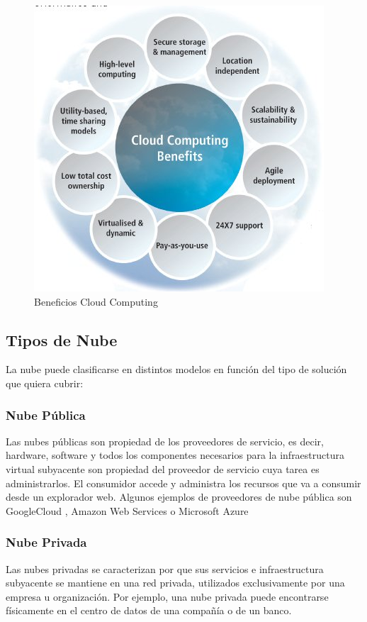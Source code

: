 \documentclass[a4paper,11pt]{book}
\begin{document}
\begin{figure}[H]
\centering
\includegraphics[scale=0.5]{imagenes/beneficiosCC.jpg}
\caption{ Beneficios Cloud Computing\cite{beneficios} }
\end{figure}


\subsection{Tipos de Nube}

La nube puede clasificarse en distintos modelos en función del tipo de solución que quiera cubrir:

\subsubsection{Nube Pública}

Las nubes públicas son propiedad de los proveedores de servicio, es decir, hardware, software y todos los componentes necesarios para la infraestructura virtual subyacente son propiedad del proveedor de servicio cuya tarea es administrarlos. El consumidor accede y administra los recursos que va a consumir desde un explorador web.  Algunos ejemplos de proveedores de nube pública son GoogleCloud\cite{gcp} , Amazon Web Services\cite{aws} o Microsoft Azure\cite{azure}

\subsubsection{Nube Privada}
Las nubes privadas se caracterizan por que sus servicios e infraestructura subyacente se mantiene en una red privada, utilizados exclusivamente por una empresa u organización. Por ejemplo, una nube privada puede encontrarse físicamente en el centro de datos de una compañía o de un banco.
\end{document}
